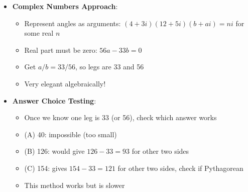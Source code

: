 \documentclass[12pt]{article}
\begin{document}
\begin{techniquesbox}
\begin{itemize}[leftmargin=*]
    \item \textbf{Complex Numbers Approach}:
    \begin{itemize}
        \item Represent angles as arguments: $(4 + 3i)(12 + 5i)(b + ai) = ni$ for some real $n$
        \item Real part must be zero: $56a - 33b = 0$
        \item Get $a/b = 33/56$, so legs are 33 and 56
        \item Very elegant algebraically!
    \end{itemize}
    
    \item \textbf{Answer Choice Testing}:
    \begin{itemize}
        \item Once we know one leg is 33 (or 56), check which answer works
        \item (A) 40: impossible (too small)
        \item (B) 126: would give $126 - 33 = 93$ for other two sides
        \item (C) 154: gives $154 - 33 = 121$ for other two sides, check if Pythagorean
        \item This method works but is slower
    \end{itemize}
\end{itemize}
\end{techniquesbox}
\end{document}
